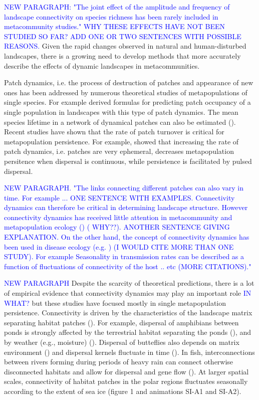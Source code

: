 \documentclass[12pt]{article}
\newcommand{\GM}[1]{\textcolor{Blue}{#1}}
\begin{document}
\GM{NEW PARAGRAPH: "The joint effect of the amplitude and frequency of landscape connectivity on species richness has been rarely included in metacommunity studies." WHY THESE EFFECTS HAVE NOT BEEN STUDIED SO FAR? ADD ONE OR TWO SENTENCES WITH POSSIBLE REASONS.} Given the rapid changes observed in natural and human-disturbed landscapes, there is a growing need to develop methods that more accurately describe the effects of dynamic landscapes in metacommunities.

Patch dynamics, i.e. the process of destruction of patches and appearance of new ones has been addressed by numerous theoretical studies of metapopulations of single species. For example \cite{Hanski1999} derived formulas for predicting patch occupancy of a single population in landscapes with this type of patch dynamics. The mean species lifetime in a network of dynamical patches can also be estimated (\cite{DrechslerJohst2010}). Recent studies have shown that the rate of patch turnover is critical for metapopulation persistence. For example, \citet{reigadaetal2015} showed that increasing the rate of patch dynamics, i.e. patches are very ephemeral, decreases metapopulation persitence when dispersal is continuous, while persistence is facilitated by pulsed dispersal. 

\GM{NEW PARAGRAPH. "The links connecting different patches can also vary in time. For example ... ONE SENTENCE WITH EXAMPLES. Connectivity dynamics can therefore be critical in determining landscape structure. However connectivity dynamics has received little attention in metacommunity and metapopulation ecology (\cite{Holyoaketal2005}) ( WHY??). ANOTHER SENTENCE GIVING EXPLANATION. On the other hand, the concept of connectivity dynamics has been used in disease ecology (e.g. \cite{Ross2010}) (I WOULD CITE MORE THAN ONE STUDY). For example Seasonality in transmission rates can be described as a function of fluctuations of connectivity of the host .. etc (MORE CITATIONS)."} 

\GM{NEW PARAGRAPH} Despite the scarcity of theoretical predictions, there is a lot of empirical evidence that connectivity dynamics may play an important role \GM{IN WHAT?} but these studies have focused mostly in single metapopulation persistence. Connectivity is driven by the characteristics of the landscape matrix separating habitat patches (\cite{EycottEtAl2012}). For example, dispersal of amphibians between ponds is strongly affected by the terrestrial habitat separating the ponds (\cite{VanBuskirk2012, ClineHunter2014}), and by weather (e.g., moisture) (\cite{RittenhouseEtAl2009}). Dispersal of butteflies also depends on matrix environment (\cite{KueflerEtAl2010}) and dispersal kernels fluctuate in time (\cite{SchtickzelleEtAl2012}). In fish, interconnections between rivers forming during periods of heavy rain can connect otherwise disconnected habitats and allow for dispersal and gene flow (\cite{BoizardEtAl2009}). At larger spatial scales, connectivity of habitat patches in the polar regions fluctuates seasonally according to the extent of sea ice (figure 1 and animations SI-A1 and SI-A2). 
\end{document}
